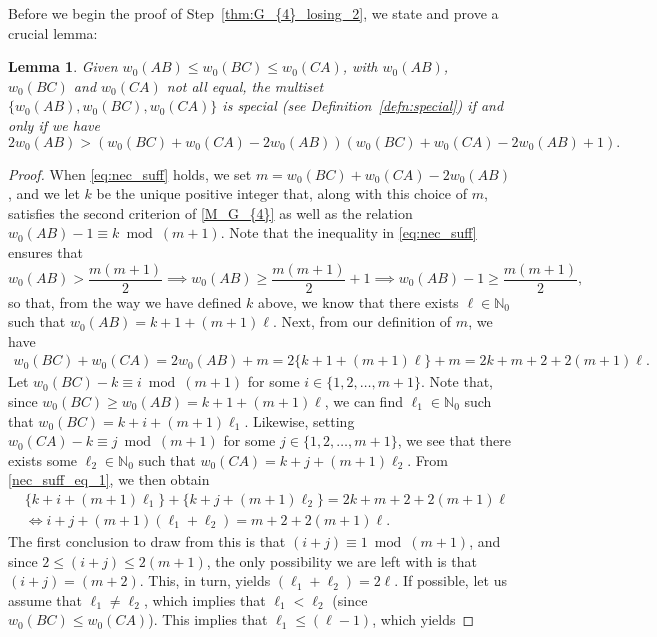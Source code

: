 \documentclass[11pt,reqno]{amsart}
\newtheorem{lemma}[theorem]{Lemma}
\theoremstyle{definition}
\theoremstyle{definition}
\begin{document}
Before we begin the proof of Step~\eqref{thm:G_{4}_losing_2}, we state and prove a crucial lemma: 
\begin{lemma}\label{lem:nec_suff}
Given $w_{0}(AB) \leqslant w_{0}(BC) \leqslant w_{0}(CA)$, with $w_{0}(AB)$, $w_{0}(BC)$ and $w_{0}(CA)$ not all equal, the multiset $\{w_{0}(AB),w_{0}(BC),w_{0}(CA)\}$ is special (see Definition~\ref{defn:special}) if and only if we have
\begin{equation}
2w_{0}(AB)>\left(w_{0}(BC)+w_{0}(CA)-2w_{0}(AB)\right)\left(w_{0}(BC)+w_{0}(CA)-2w_{0}(AB)+1\right).\label{eq:nec_suff}
\end{equation}
\end{lemma}
\begin{proof}
When \eqref{eq:nec_suff} holds, we set $m=w_{0}(BC)+w_{0}(CA)-2w_{0}(AB)$, and we let $k$ be the unique positive integer that, along with this choice of $m$, satisfies the second criterion of \eqref{M_G_{4}} as well as the relation $w_{0}(AB)-1\equiv k\bmod(m+1)$. Note that the inequality in \eqref{eq:nec_suff} ensures that 
\begin{equation}
w_{0}(AB)>\frac{m(m+1)}{2} \implies w_{0}(AB)\geqslant \frac{m(m+1)}{2}+1 \implies w_{0}(AB)-1\geqslant \frac{m(m+1)}{2},\nonumber
\end{equation}
so that, from the way we have defined $k$ above, we know that there exists $\ell \in \mathbb{N}_{0}$ such that $w_{0}(AB)=k+1+(m+1)\ell$. Next, from our definition of $m$, we have
\begin{align}
w_{0}(BC)+w_{0}(CA)=2w_{0}(AB)+m=2\{k+1+(m+1)\ell\}+m=2k+m+2+2(m+1)\ell.\label{nec_suff_eq_1}
\end{align}
Let $w_{0}(BC)-k\equiv i \bmod (m+1)$ for some $i \in \{1,2,\ldots,m+1\}$. Note that, since $w_{0}(BC)\geqslant w_{0}(AB)=k+1+(m+1)\ell$, we can find $\ell_{1} \in \mathbb{N}_{0}$ such that $w_{0}(BC)=k+i+(m+1)\ell_{1}$. Likewise, setting $w_{0}(CA)-k\equiv j \bmod(m+1)$ for some $j \in \{1,2,\ldots,m+1\}$, we see that there exists some $\ell_{2}\in\mathbb{N}_{0}$ such that $w_{0}(CA)=k+j+(m+1)\ell_{2}$. From \eqref{nec_suff_eq_1}, we then obtain
\begin{align}
{}&\{k+i+(m+1)\ell_{1}\}+\{k+j+(m+1)\ell_{2}\}=2k+m+2+2(m+1)\ell \nonumber\\
{}&\Longleftrightarrow i+j+(m+1)(\ell_{1}+\ell_{2})=m+2+2(m+1)\ell.\nonumber
\end{align}
The first conclusion to draw from this is that $(i+j) \equiv 1 \bmod (m+1)$, and since $2 \leqslant (i+j) \leqslant 2(m+1)$, the only possibility we are left with is that $(i+j)=(m+2)$. This, in turn, yields $(\ell_{1}+\ell_{2})=2\ell$. If possible, let us assume that $\ell_{1}\neq \ell_{2}$, which implies that $\ell_{1}<\ell_{2}$ (since $w_{0}(BC)\leqslant w_{0}(CA)$). This implies that $\ell_{1}\leqslant (\ell-1)$, which yields

\end{proof}
\end{document}
